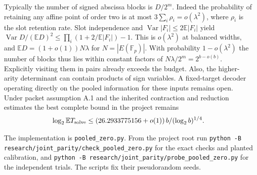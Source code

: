 \documentclass[11pt]{article}
\newcommand{\F}{\mathbb F}
\newcommand{\E}{\mathbb E}
\begin{document}
Typically the number of signed abscissa blocks is $D/2^m$. Indeed the
probability of retaining any affine point of order two is at most
$3\sum_i\rho_i=o(\lambda^2)$, where $\rho_i$ is the slot retention rate.
Slot independence and $\operatorname{Var}|F_i|\le2\E|F_i|$ yield
$\operatorname{Var}D/(\E D)^2\le\prod_i(1+2/\E|F_i|)-1$.
This is $o(\lambda^2)$ at balanced widths, and $\E D=(1+o(1))N\lambda$
for $N=|E(\F_p)|$. With probability $1-o(\lambda^2)$ the number of
blocks thus lies within constant factors of $N\lambda/2^m=2^{b-o(b)}$.
Explicitly visiting them in pairs already exceeds the budget. Also,
the higher-arity determinant can contain products of sign variables.
A fixed-target decoder operating directly on the pooled information
for these inputs remains open. Under packet assumption A.1 and the
inherited contraction and reduction estimates the best complete bound
in the project remains
\[
 \log_2 \E T_{\rm solve}
 \le (26.2933775156+o(1))\,b/(\log_2 b)^{1/4}.
\]

The implementation is \texttt{pooled\_zero.py}. From the project root run
\texttt{python -B research/joint\_parity/check\_pooled\_zero.py} for
the exact checks and planted calibration, and
\texttt{python -B research/joint\_parity/probe\_pooled\_zero.py}
for the independent trials. The scripts fix their pseudorandom seeds.
\end{document}
